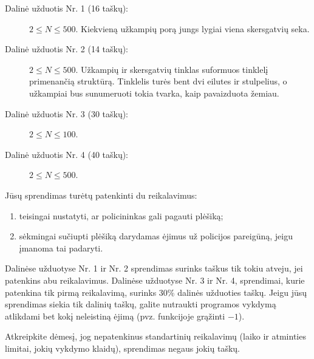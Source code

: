 \documentclass{boi2014-lt}
\begin{document}
    \Scoring
    
    \begin{description}
        \item[Dalinė užduotis Nr. 1 (16 taškų):] $2 \le N \le 500$.
        Kiekvieną užkampių porą jungs lygiai viena skersgatvių seka.
        \item[Dalinė užduotis Nr. 2 (14 taškų):] $2 \le N \le 500$.
			Užkampių ir skersgatvių tinklas suformuos tinklelį primenančią struktūrą.
			Tinklelis turės bent dvi eilutes ir stulpelius, o užkampiai bus
			sunumeruoti tokia tvarka, kaip pavaizduota žemiau.
        \begin{figure}[h!]
           \centering
        \end{figure}
        \item[Dalinė užduotis Nr. 3 (30 taškų):] $2 \le N \le 100$.
        \item[Dalinė užduotis Nr. 4 (40 taškų):] $2 \le N \le 500$.
    \end{description}
    
    Jūsų sprendimas turėtų patenkinti du reikalavimus:
    \begin{enumerate}
    	\item teisingai nustatyti, ar policininkas gali pagauti plėšiką;
		\item sėkmingai sučiupti plėšiką darydamas ėjimus už policijos
			pareigūną, jeigu įmanoma tai padaryti.
    \end{enumerate}
    
	Dalinėse užduotyse Nr. 1 ir Nr. 2 sprendimas surinks taškus tik tokiu
	atveju, jei patenkins abu reikalavimus.
	Dalinėse užduotyse Nr. 3 ir Nr. 4, sprendimai, kurie patenkina tik pirmą
	reikalavimą, surinks 30\% dalinės užduoties taškų.
	Jeigu jūsų sprendimas siekia tik dalinių taškų, galite nutraukti programos
	vykdymą atlikdami bet kokį neleistiną ėjimą (pvz. funkcijoje
	 grąžinti $-1$).

	Atkreipkite dėmesį, jog nepatenkinus standartinių reikalavimų (laiko ir
	atminties limitai, jokių vykdymo klaidų), sprendimas negaus jokių taškų.
    
    \Constraints
    
\end{document}
